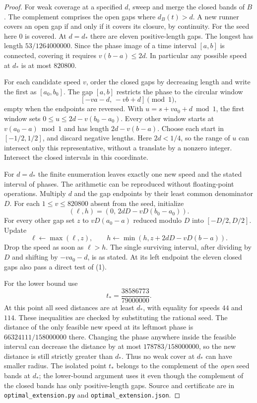 \documentclass[11pt]{article}
\begin{document}
\begin{proof}
For weak coverage at a specified \(d\), sweep and merge the closed
bands of \(B\). The complement comprises the open gaps where
\(d_B(t)>d\). A new runner covers an open gap if and only if it
covers its closure, by continuity. For the seed here \(0\) is covered.
At \(d=d_*\) there are eleven positive-length gaps. The longest has
length \(53/1264000000\). Since the phase image of a time interval
\([a,b]\) is connected, covering it requires \(v(b-a)\le2d\).
In particular any possible speed at \(d_*\) is at most \(820800\).

For each candidate speed \(v\), order the closed gaps by decreasing
length and write the first as \([a_0,b_0]\).
The gap \([a,b]\) restricts the phase to the circular window
\[
 [ -va-d,\,-vb+d]\pmod1,
 \tag{1}\label{eq:window}
\]
empty when the endpoints are reversed. With
\(u=s+va_0+d\bmod1\), the first window sets
\(0\le u\le 2d-v(b_0-a_0)\). Every other window starts at
\(v(a_0-a)\bmod1\) and has length \(2d-v(b-a)\).
Choose each start in \([-1/2,1/2]\), and discard negative lengths.
Here \(2d<1/4\), so the range of \(u\) can intersect only this
representative, without a translate by a nonzero integer.
Intersect the closed intervals in this coordinate.

For \(d=d_*\) the finite enumeration leaves exactly one new speed
and the stated interval of phases. The arithmetic can be reproduced
without floating-point operations. Multiply \(d\) and the gap
endpoints by their least common denominator \(D\). For each
\(1\le v\le820800\) absent from the seed, initialize
\[
 (\ell,h)=(0,\,2dD-vD(b_0-a_0)).
\]
For every other gap set \(z\) to \(vD(a_0-a)\) reduced modulo \(D\)
into \([-D/2,D/2]\). Update
\[
  \ell\gets\max(\ell,z),\qquad
  h\gets\min(h,z+2dD-vD(b-a)).
\]
Drop the speed as soon as \(\ell>h\). The single surviving interval,
after dividing by \(D\) and shifting by \(-va_0-d\), is as stated.
At its left endpoint the eleven closed gaps also pass a direct
test of (1).

For the lower bound use
\[
 t_*=\frac{38586773}{79000000}.
\]
At this point all seed distances are at least \(d_*\), with equality
for speeds \(44\) and \(114\). These inequalities are checked by
substituting the rational seed. The distance of the only feasible
new speed at its leftmost phase is \(66324111/158000000\) there.
Changing the phase anywhere inside the feasible interval can
decrease the distance by at most \(178783/158000000\), so the new
distance is still strictly greater than \(d_*\). Thus no weak cover
at \(d_*\) can have smaller radius. The isolated point \(t_*\)
belongs to the complement of the \emph{open} seed bands at \(d_*\);
the lower-bound argument uses it even though the complement of the
closed bands has only positive-length gaps. Source and certificate
are in \texttt{optimal\_extension.py} and
\texttt{optimal\_extension.json}.
\end{proof}
\end{document}
